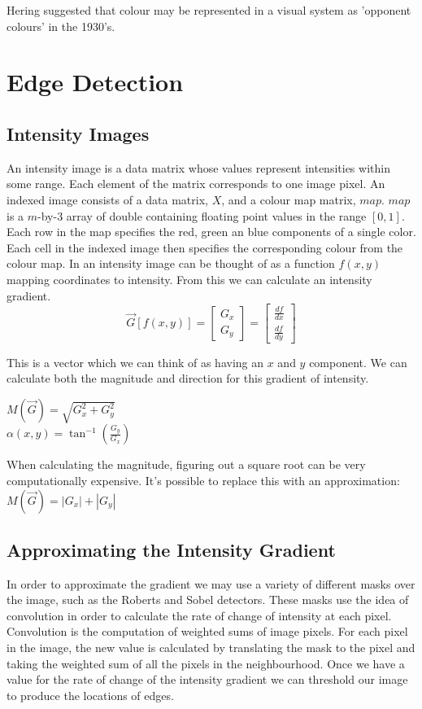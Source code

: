 \documentclass{article}
\begin{document}
	\par 
	Hering suggested that colour may be represented in a visual system as 'opponent colours' in the 1930's.
	
	
	\section{Edge Detection}
	\subsection{Intensity Images}
	An intensity image is a data matrix whose values represent intensities within some range. Each element of the matrix corresponds to one image pixel. An indexed image consists of a data matrix, $X$, and a colour map matrix, $map$. $map$ is a $m$-by-3 array of double containing floating point values in the range $[0, 1]$. Each row in the map specifies the red, green an blue components of a single color. Each cell in the indexed image then specifies the corresponding colour from the colour map. In an intensity image can be thought of as a function $f(x, y)$ mapping coordinates to intensity. From this we can calculate an intensity gradient.
	\begingroup
	\renewcommand*{\arraystretch}{1.5}
	\[ \overrightarrow{G}[f(x,y)] = \begin{bmatrix}G_{x} \\ G_{y} \end{bmatrix} = \begin{bmatrix} \frac{df}{dx} \\ \frac{df}{dy} \end{bmatrix} \]	
	\endgroup

	 This is a vector which we can think of as having an $x$ and $y$ component. We can calculate both the magnitude and direction for this gradient of intensity. 
	\begin{multicols}{2}
		\noindent
		\centering
			$M(\overrightarrow{G}) = \sqrt{G_{x}^{2} + G_{y}^{2}}$ \\
			$\alpha(x, y) = \tan^{-1}\left(\frac{G_y}{G_x}\right)$
	\end{multicols}
	
	When calculating the magnitude, figuring out a square root can be very computationally expensive. It's possible to replace this with an approximation: $M(\overrightarrow{G}) = |G_{x}| + |G_{y}|$
	
	\subsection{Approximating the Intensity Gradient}
	In order to approximate the gradient we may use a variety of different masks over the image, such as the Roberts and Sobel detectors. These masks use the idea of convolution in order to calculate the rate of change of intensity at each pixel. Convolution is the computation of weighted sums of image pixels. For each pixel in the image, the new value is calculated by translating the mask to the pixel and taking the weighted sum of all the pixels in the neighbourhood. Once we have a value for the rate of change of the intensity gradient we can threshold our image to produce the locations of edges.
	
\end{document}
